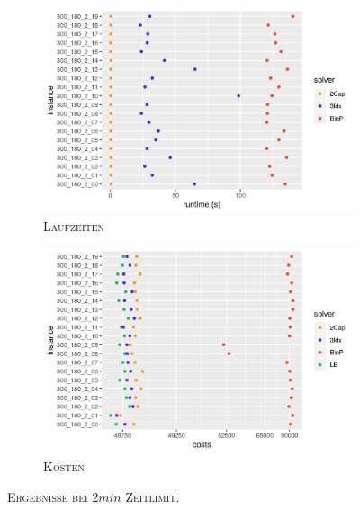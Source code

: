 \begin{figure}[H]
\centering
\begin{subfigure}[b]{0.4\textwidth}
\centering
\includegraphics[width=1.3\textwidth]{img/solver_instance_time_b=2_m_120s.png}
\caption{\textsc{Laufzeiten}}
\label{fig:b=2_m_runtimes}
\end{subfigure}
\hfill
\begin{subfigure}[b]{0.4\textwidth}
\centering
\includegraphics[width=1.3\textwidth]{img/solver_instance_cost_b=2_m_120s.png}
\caption{\textsc{Kosten}}
\label{fig:b=2_m_costs}
\end{subfigure}
\caption{\textsc{Ergebnisse bei $2min$ Zeitlimit}.}
\label{fig:res_plots_b=2_m}
\end{figure}

